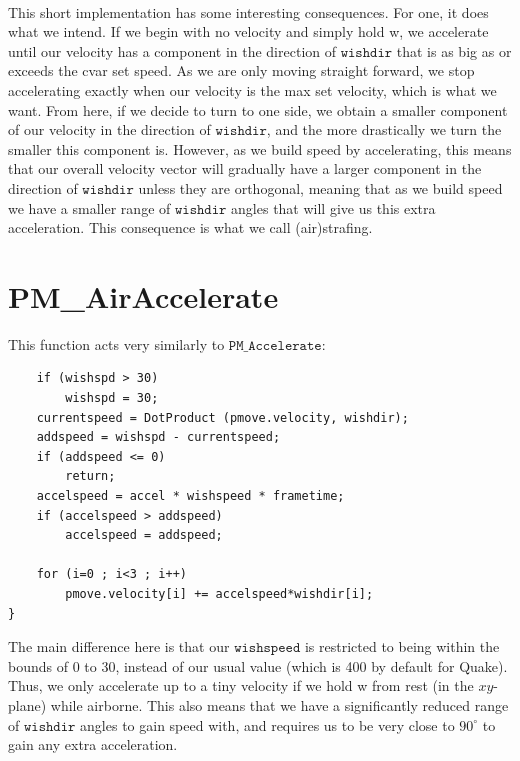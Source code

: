 \documentclass{article}
\begin{document}
\\
This short implementation has some interesting consequences. For one, it does what we intend. If we begin with no velocity and simply hold w, we accelerate until our velocity has a component in the direction of $\texttt{wishdir}$ that is as big as or exceeds the cvar set speed. As we are only moving straight forward, we stop accelerating exactly when our velocity is the max set velocity, which is what we want. From here, if we decide to turn to one side, we obtain a smaller component of our velocity in the direction of $\texttt{wishdir}$, and the more drastically we turn the smaller this component is. However, as we build speed by accelerating, this means that our overall velocity vector will gradually have a larger component in the direction of $\texttt{wishdir}$ unless they are orthogonal, meaning that as we build speed we have a smaller range of $\texttt{wishdir}$ angles that will give us this extra acceleration. This consequence is what we call (air)strafing. 

\section{PM\_AirAccelerate}
This function acts very similarly to $\texttt{PM\_Accelerate}$:
\begin{verbatim}
	if (wishspd > 30)
		wishspd = 30;
	currentspeed = DotProduct (pmove.velocity, wishdir);
	addspeed = wishspd - currentspeed;
	if (addspeed <= 0)
		return;
	accelspeed = accel * wishspeed * frametime;
	if (accelspeed > addspeed)
		accelspeed = addspeed;
	
	for (i=0 ; i<3 ; i++)
		pmove.velocity[i] += accelspeed*wishdir[i];	
}
\end{verbatim}

The main difference here is that our $\texttt{wishspeed}$ is restricted to being within the bounds of 0 to 30, instead of our usual value (which is 400 by default for Quake). Thus, we only accelerate up to a tiny velocity if we hold w from rest (in the $xy$-plane) while airborne. This also means that we have a significantly reduced range of $\texttt{wishdir}$ angles to gain speed with, and requires us to be very close to $90^{\circ}$ to gain any extra acceleration. 
\end{document}

